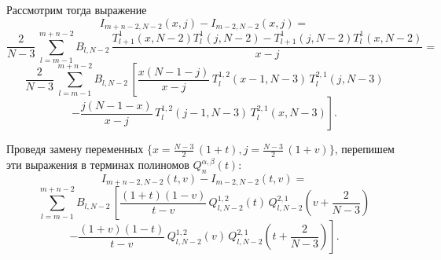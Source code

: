 \documentclass[12pt]{book}
\begin{document}
\newpage
\newpage

Рассмотрим тогда выражение
\begin{equation*}
  I_{m+n-2,N-2}(x,j) - I_{m-2,N-2}(x,j) =
\end{equation*}
\begin{equation*}
  \frac{2}{N-3}\,
  \sum_{l=m-1}^{m+n-2} B_{l,N-2}\,
  \frac{T_{l+1}^1(x,N-2) T_{l}^1(j,N-2) - T_{l+1}^1(j,N-2) T_{l}^1(x,N-2)}{x-j} =
\end{equation*}
\begin{equation*}
  \frac{2}{N-3}\,\sum_{l=m-1}^{m+n-2} B_{l,N-2}\, \left[
    \frac{x(N-1-j)}{x-j}\,T^{1,2}_{l}(x-1,N-3)\,T^{2,1}_{l}(j,N-3)
  \right.
\end{equation*}
\begin{equation*}
\left.
  - \frac{j(N-1-x)}{x-j}\,T^{1,2}_{l}(j-1,N-3)\,T^{2,1}_{l}(x,N-3)
\right].
\end{equation*}

Проведя замену переменных $\{x = \frac{N-3}{2}\,(1+t), j = \frac{N-3}{2}\,(1+v)\}$, перепишем эти выражения в терминах полиномов $Q_n^{\alpha,\beta}(t)$:
\begin{equation*}
  I_{m+n-2,N-2}\left(t,v \right) - I_{m-2,N-2}\left(t,v \right) =
\end{equation*}
\begin{equation*}
  \sum_{l=m-1}^{m+n-2} B_{l,N-2}\,
  \left[
    \frac{(1+t)(1-v)}
    {t-v}
    \,Q^{1,2}_{l,N-2}\left(t\right)
    \,Q^{2,1}_{l,N-2}\left(v+\frac{2}{N-3}\right)
  \right.
\end{equation*}
\begin{equation*}
\left.
  - \frac{(1+v)(1-t)}
    {t-v}
    \,Q^{1,2}_{l,N-2}\left(v\right)
    \,Q^{2,1}_{l,N-2}\left(t+\frac{2}{N-3}\right)
\right].
\end{equation*}
\end{document}
